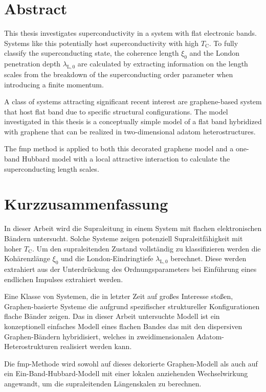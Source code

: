 \documentclass[../main.tex]{subfiles}
\begin{document}
	
\clearpage
\section*{Abstract}

This thesis investigates superconductivity in a system with flat electronic bands.
Systems like this potentially host superconductivity with high \(T_{\mathrm{C}}\).
To fully classify the superconducting state, the coherence length \(\xi_0\) and the London penetration depth \(\lambda_{\mathrm{L}, 0}\) are calculated by extracting information on the length scales from the breakdown of the superconducting order parameter when introducing a finite momentum.

A class of systems attracting significant recent interest are graphene-based system that host flat band due to specific structural configurations.
The model investigated in this thesis is a conceptually simple model of a flat band hybridized with graphene that can be realized in two-dimensional adatom heterostructures.

The \gls{fmp} method is applied to both this decorated graphene model and a one-band Hubbard model with a local attractive interaction to calculate the superconducting length scales.

\glsresetall
\section*{Kurzzusammenfassung}

In dieser Arbeit wird die Supraleitung in einem System mit flachen elektronischen Bändern untersucht.
Solche Systeme zeigen potenziell Supraleitfähigkeit mit hoher \(T_{\mathrm{C}}\).
Um den supraleitenden Zustand vollständig zu klassifizieren werden die Kohärenzlänge \(\xi_0\) und die London-Eindringtiefe \(\lambda_{\mathrm{L}, 0}\) berechnet.
Diese werden extrahiert aus der Unterdrückung des Ordnungsparameters bei Einführung eines endlichen Impulses extrahiert werden.

Eine Klasse von Systemen, die in letzter Zeit auf großes Interesse stoßen, Graphen-basierte Systeme die aufgrund spezifischer struktureller Konfigurationen flache Bänder zeigen.
Das in dieser Arbeit untersuchte Modell ist ein konzeptionell einfaches Modell eines flachen Bandes das mit den dispersiven Graphen-Bändern hybridisiert, welches in zweidimensionalen Adatom-Heterostrukturen realisiert werden kann.

Die \gls{fmp}-Methode wird sowohl auf dieses dekorierte Graphen-Modell als auch auf ein Ein-Band-Hubbard-Modell mit einer lokalen anziehenden Wechselwirkung angewandt, um die supraleitenden Längenskalen zu berechnen.
\end{document}
